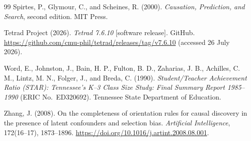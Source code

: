 \documentclass[11pt,a4paper]{article}
\theoremstyle{definition}
\begin{document}
\begin{thebibliography}{99}
Spirtes, P., Glymour, C., and Scheines, R. (2000).
\textit{Causation, Prediction, and Search}, second edition. MIT Press.

Tetrad Project (2026).
\textit{Tetrad 7.6.10} [software release]. GitHub.
\url{https://github.com/cmu-phil/tetrad/releases/tag/v7.6.10}
(accessed 26 July 2026).

Word, E., Johnston, J., Bain, H. P., Fulton, B. D., Zaharias, J. B.,
Achilles, C. M., Lintz, M. N., Folger, J., and Breda, C. (1990).
\textit{Student/Teacher Achievement Ratio (STAR): Tennessee's K--3 Class Size
Study: Final Summary Report 1985--1990} (ERIC No.~ED320692).
Tennessee State Department of Education.

Zhang, J. (2008).
On the completeness of orientation rules for causal discovery in the
presence of latent confounders and selection bias.
\textit{Artificial Intelligence}, 172(16--17), 1873--1896.
\url{https://doi.org/10.1016/j.artint.2008.08.001}.

\end{thebibliography}
\end{document}
